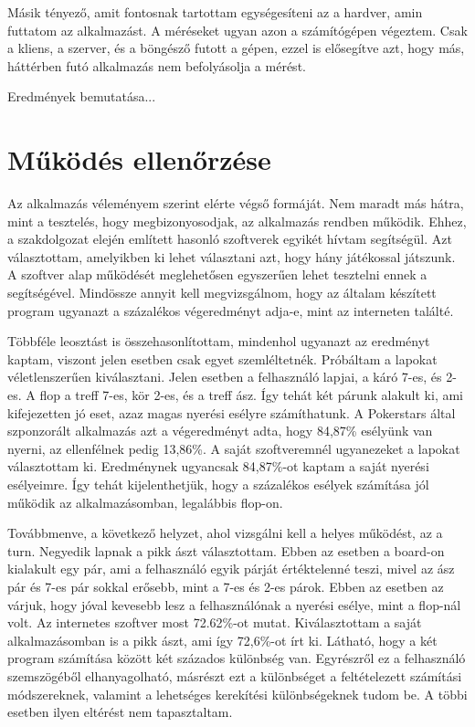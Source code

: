 Másik tényező, amit fontosnak tartottam egységesíteni az a hardver, amin futtatom az alkalmazást. A méréseket ugyan azon a számítógépen végeztem. Csak a kliens, a szerver, és a böngésző futott a gépen, ezzel is elősegítve azt, hogy más, háttérben futó alkalmazás nem befolyásolja a mérést. 

Eredmények bemutatása...

\section{Működés ellenőrzése}
Az alkalmazás véleményem szerint elérte végső formáját. Nem maradt más hátra, mint a tesztelés, hogy megbizonyosodjak, az alkalmazás rendben működik. Ehhez, a szakdolgozat elején említett hasonló szoftverek egyikét hívtam segítségül. Azt választottam, amelyikben ki lehet választani azt, hogy hány játékossal játszunk. A szoftver alap működését meglehetősen egyszerűen lehet tesztelni ennek a segítségével. Mindössze annyit kell megvizsgálnom, hogy az általam készített program ugyanazt a százalékos végeredményt adja-e, mint az interneten találté.

Többféle leosztást is összehasonlítottam, mindenhol ugyanazt az eredményt kaptam, viszont jelen esetben csak egyet szemléltetnék. Próbáltam a lapokat véletlenszerűen kiválasztani. Jelen esetben a felhasználó lapjai, a káró 7-es, és 2-es. A flop a treff 7-es, kör 2-es, és a treff ász. Így tehát két párunk alakult ki, ami kifejezetten jó eset, azaz magas nyerési esélyre számíthatunk. A Pokerstars által szponzorált alkalmazás azt a végeredményt adta, hogy 84,87\% esélyünk van nyerni, az ellenfélnek pedig 13,86\%. A saját szoftveremnél ugyanezeket a lapokat választottam ki. Eredménynek ugyancsak 84,87\%-ot kaptam a saját nyerési esélyeimre. Így tehát kijelenthetjük, hogy a százalékos esélyek számítása jól működik az alkalmazásomban, legalábbis flop-on.

Továbbmenve, a következő helyzet, ahol vizsgálni kell a helyes működést, az a turn. Negyedik lapnak a pikk ászt választottam. Ebben az esetben a board-on kialakult egy pár, ami a felhasználó egyik párját értéktelenné teszi, mivel az ász pár és 7-es pár sokkal erősebb, mint a 7-es és 2-es párok. Ebben az esetben az várjuk, hogy jóval kevesebb lesz a felhasználónak a nyerési esélye, mint a flop-nál volt. Az internetes szoftver most 72.62\%-ot mutat. Kiválasztottam a saját alkalmazásomban is a pikk ászt, ami így 72,6\%-ot írt ki. Látható, hogy a két program számítása között két százados különbség van. Egyrészről ez a felhasználó szemszögéből elhanyagolható, másrészt ezt a különbséget a feltételezett számítási módszereknek, valamint a lehetséges kerekítési különbségeknek tudom be. A többi esetben ilyen eltérést nem tapasztaltam.

